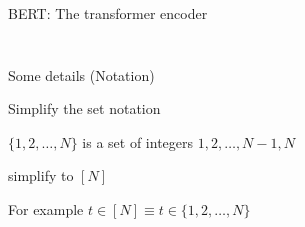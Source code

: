 \documentclass[12pt,aspectratio=169,handout]{beamer}
\begin{document}
\begin{frame}{BERT: The transformer encoder}
\begin{columns}
\begin{column}{0.3\linewidth}
\begin{figure}
			\end{figure}
		\end{column}
	\end{columns}
	
\end{frame}


\begin{frame}{Some details (Notation)}
	
	Simplify the set notation
	
	$\{1, 2, \ldots, N\}$ is a set of integers $1, 2, \ldots, N - 1, N$
	
	simplify to $[N]$
	
	For example $t \in [N] \equiv t \in \{1, 2, \ldots, N\}$
	
	
	
\end{frame}
\end{document}
